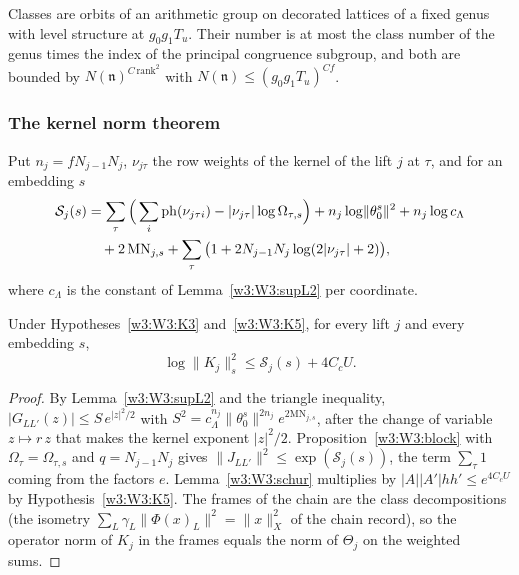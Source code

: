 Classes are orbits of an arithmetic group on decorated lattices of a fixed genus with level structure at $g_0g_1T_u$. Their number is at most the class number of the genus times the index of the principal congruence subgroup, and both are bounded by $N(\mathfrak n)^{C\,\mathrm{rank}^2}$ with $N(\mathfrak n)\le(g_0g_1T_u)^{Cf}$. 

\subsubsection{The kernel norm theorem}

Put $n_j=fN_{j-1}N_j$, $\nu_{j\tau}$ the row weights of the kernel of the lift $j$ at $\tau$, and for an embedding $s$
\[
\begin{aligned}
\mathcal S_j(s)&=\sum_{\tau}\Big(\sum_i\operatorname{ph}(\nu_{j\tau i})-\lvert\nu_{j\tau}\rvert\log\Omega_{\tau,s}\Big)+n_j\log\lVert\theta_0^s\rVert^2+n_j\log c_\Lambda\\ &\quad{}+2\,\mathrm{MN}_{j,s}+\sum_\tau\big(1+2N_{j-1}N_j\log(2\lvert\nu_{j\tau}\rvert+2)\big),
\end{aligned}
\]
where $c_\Lambda$ is the constant of Lemma~\ref{w3:W3:supL2} per coordinate.

\begin{proposition}\label{w3:W3:onesigma}
Under Hypotheses~\ref{w3:W3:K3} and~\ref{w3:W3:K5}, for every lift $j$ and every embedding $s$,
\[
\log\lVert K_j\rVert_s^2\le\mathcal S_j(s)+4C_cU .
\]
\end{proposition}

\begin{proof}
By Lemma~\ref{w3:W3:supL2} and the triangle inequality, $\lvert G_{LL'}(z)\rvert\le S\,e^{\lvert z\rvert^2/2}$ with $S^2=c_\Lambda^{n_j}\lVert\theta_0^s\rVert^{2n_j}e^{2\mathrm{MN}_{j,s}}$, after the change of variable $z\mapsto r\,z$ that makes the kernel exponent $\lvert z\rvert^2/2$. Proposition~\ref{w3:W3:block} with $\Omega_\tau=\Omega_{\tau,s}$ and $q=N_{j-1}N_j$ gives $\lVert J_{LL'}\rVert^2\le\exp(\mathcal S_j(s))$, the term $\sum_\tau1$ coming from the factors $e$. Lemma~\ref{w3:W3:schur} multiplies by $\lvert A\rvert\lvert A'\rvert hh'\le e^{4C_cU}$ by Hypothesis~\ref{w3:W3:K5}. The frames of the chain are the class decompositions (the isometry $\sum_L\gamma_L\lVert\Phi(x)_L\rVert^2=\lVert x\rVert_{X}^2$ of the chain record), so the operator norm of $K_j$ in the frames equals the norm of $\Theta_j$ on the weighted sums.
\end{proof}

